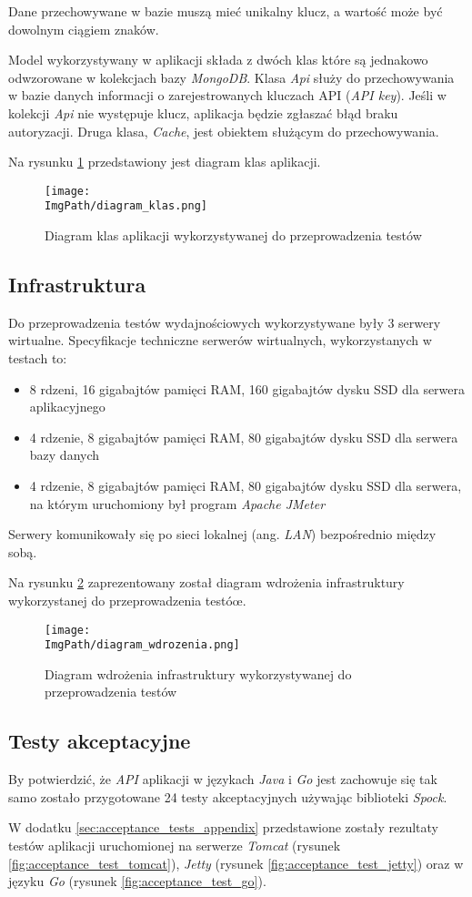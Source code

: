 Dane przechowywane w bazie muszą mieć unikalny klucz, a wartość może być dowolnym ciągiem znaków. 

Model wykorzystywany w aplikacji składa z dwóch klas które są jednakowo odwzorowane w kolekcjach bazy \textsl{MongoDB}. Klasa \textsl{Api} służy do przechowywania w bazie danych informacji o zarejestrowanych kluczach API (\textsl{API key}). Jeśli w kolekcji \textsl{Api} nie występuje klucz, aplikacja będzie zgłaszać błąd braku autoryzacji. Druga klasa, \textsl{Cache}, jest obiektem służącym do przechowywania.

Na rysunku \ref{fig:class_diagram} przedstawiony jest diagram klas aplikacji. 
\begin{figure}[!ht]
\centering
\texttt{[image: \\ImgPath/diagram\_klas.png]}
\caption{Diagram klas aplikacji wykorzystywanej do przeprowadzenia testów}
\label{fig:class_diagram}
\end{figure}

\subsection{Infrastruktura}
Do przeprowadzenia testów wydajnościowych wykorzystywane były 3 serwery wirtualne. Specyfikacje techniczne serwerów wirtualnych, wykorzystanych w testach to: 
\begin{itemize}
    \item 8 rdzeni, 16 gigabajtów pamięci RAM, 160 gigabajtów dysku SSD dla serwera aplikacyjnego
    \item 4 rdzenie, 8 gigabajtów pamięci RAM, 80 gigabajtów dysku SSD dla serwera bazy danych 
    \item 4 rdzenie, 8 gigabajtów pamięci RAM, 80 gigabajtów dysku SSD dla serwera, na którym uruchomiony był program \textsl{Apache JMeter}
\end{itemize}
Serwery komunikowały się po sieci lokalnej (ang. \textsl{LAN}) bezpośrednio między sobą.

Na rysunku \ref{fig:deployment_diagram} zaprezentowany został diagram wdrożenia infrastruktury wykorzystanej do przeprowadzenia testóœ.
\begin{figure}[!ht]
\centering
\texttt{[image: \\ImgPath/diagram\_wdrozenia.png]}
\caption{Diagram wdrożenia infrastruktury wykorzystywanej do przeprowadzenia testów}
\label{fig:deployment_diagram}
\end{figure}

\subsection{Testy akceptacyjne} 

By potwierdzić, że \textsl{API} aplikacji w językach \textsl{Java} i \textsl{Go} jest zachowuje się tak samo zostało przygotowane 24 testy akceptacyjnych używając biblioteki \textsl{Spock}. 

W dodatku \ref{sec:acceptance_tests_appendix} przedstawione zostały rezultaty testów aplikacji uruchomionej na serwerze \textsl{Tomcat} (rysunek \ref{fig:acceptance_test_tomcat}), \textsl{Jetty} (rysunek \ref{fig:acceptance_test_jetty}) oraz w języku \textsl{Go} (rysunek \ref{fig:acceptance_test_go}).

